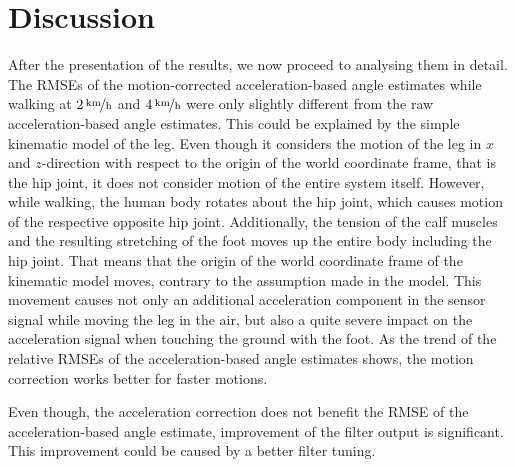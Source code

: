 \section{Discussion}

After the presentation of the results, we now proceed to analysing them in detail. The RMSEs of the motion-corrected acceleration-based angle estimates while walking at $\unitfrac[2]{km}{h}$ and $\unitfrac[4]{km}{h}$ were only slightly different from the raw acceleration-based angle estimates. This could be explained by the simple kinematic model of the leg. Even though it considers the motion of the leg in $x$ and $z$-direction with respect to the origin of the world coordinate frame, that is the hip joint, it does not consider motion of the entire system itself. However, while walking, the human body rotates about the hip joint, which causes motion of the respective opposite hip joint. Additionally, the tension of the calf muscles and the resulting stretching of the foot moves up the entire body including the hip joint. That means that the origin of the world coordinate frame of the kinematic model moves, contrary to the assumption made in the model. This movement causes not only an additional acceleration component in the sensor signal while moving the leg in the air, but also a quite severe impact on the acceleration signal when touching the ground with the foot. As the trend of the relative RMSEs of the acceleration-based angle estimates shows, the motion correction works better for faster motions. 

 Even though, the acceleration correction does not benefit the RMSE of the acceleration-based angle estimate, improvement of the filter output is significant. This improvement could be caused by a better filter tuning. 



